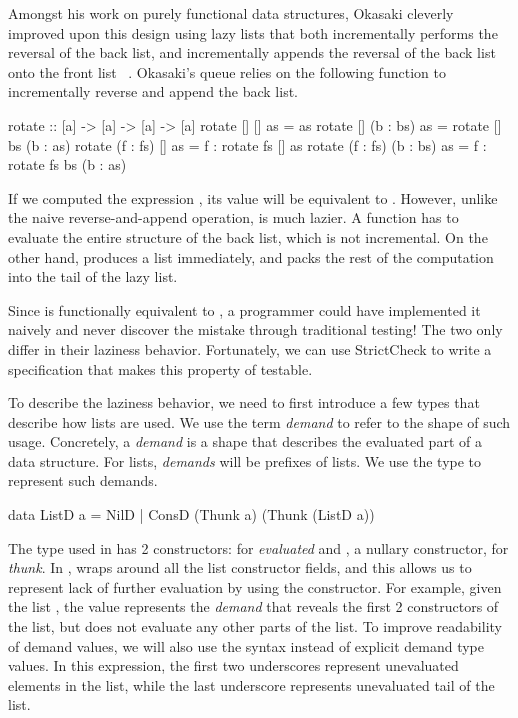 \documentclass[acmsmall,review]{acmart}\settopmatter{}
\begin{document}
Amongst his work on purely functional data structures\cite{Okasaki},
Okasaki cleverly improved upon this design using lazy lists that both
incrementally performs the reversal of the back list, and
incrementally appends the reversal of the back list onto the front
list ~\cite{Okasaki95simpleand}. Okasaki's queue relies on the
following  function to incrementally reverse and append the
back list.
\begin{inlinecode}
  rotate :: [a] -> [a] -> [a] -> [a]
  rotate      []       []  as =                       as
  rotate      []  (b : bs) as =     rotate [] bs (b : as)
  rotate (f : fs)      []  as = f : rotate fs []      as
  rotate (f : fs) (b : bs) as = f : rotate fs bs (b : as)
\end{inlinecode}
If we computed the expression , its value
will be equivalent to . However, unlike
the naive reverse-and-append operation,  is much
lazier. A  function has to evaluate the entire structure
of the back list, which is not incremental. On the other
hand,  produces a list immediately, and packs the rest of
the computation into the tail of the lazy list.

Since  is functionally equivalent to , a programmer could have implemented it naively and never
discover the mistake through traditional testing! The two only differ
in their laziness behavior. Fortunately, we can use StrictCheck to
write a specification that makes this property of 
testable.

To describe the laziness behavior, we need to first introduce a few
types that describe how lists are used. We use the
term \textit{demand} to refer to the shape of such usage. Concretely,
a \textit{demand} is a shape that describes the evaluated part of a
data structure. For lists, \textit{demands} will be prefixes of
lists. We use the type  to represent such demands.
%
\begin{inlinecode}
  data ListD a = NilD
               | ConsD (Thunk a) (Thunk (ListD a))
\end{inlinecode}
%
The  type used in  has 2 constructors: 
for \textit{evaluated} and , a nullary constructor,
for \textit{thunk}. In ,  wraps around all the
list constructor fields, and this allows us to represent lack of
further evaluation by using the  constructor. For example, given
the list \lk{[1, 2, 3]}, the value  represents
the \textit{demand} that reveals the first 2  constructors of
the list, but does not evaluate any other parts of the list. To
improve readability of demand values, we will also use the
syntax \lk{\_ : \_ : \_} instead of explicit demand type values. In
this expression, the first two underscores represent unevaluated
elements in the list, while the last underscore represents unevaluated
tail of the list.
\end{document}
